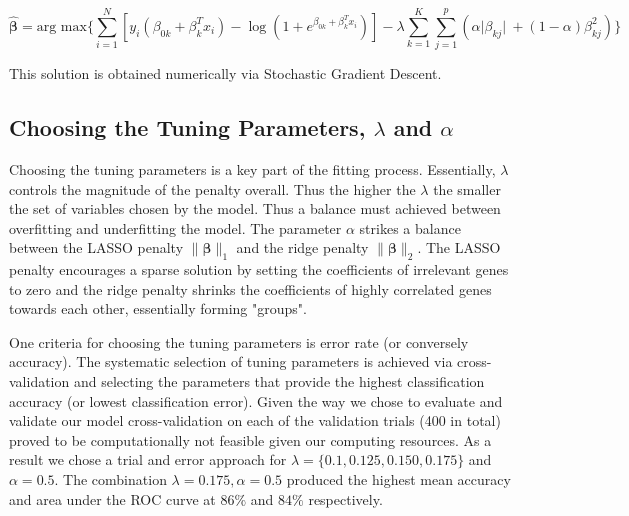 \documentclass[12pt,a4paper]{article}
\begin{document}
\begin{equation} \label{eq:8}
\boldsymbol{\hat{\beta}} = \text{arg max}\Biggr\{\sum_{i=1}^N 
\left[ y_i\left( \beta_{0k}+\beta_k^T x_i \right) -\log \left( 1 + e^{\beta_{0k} + \beta_k^T x_i} \right) \right]-\lambda \sum_{k = 1}^K \sum_{j = 1}^p \left(\alpha\vert\beta_{kj}\vert\ +  \left(1-\alpha\right)\beta_{kj}^2\right) \Biggr\}
\end{equation}
\par This solution is obtained numerically via Stochastic Gradient Descent.
\subsection{Choosing the Tuning Parameters, $\lambda$ and $\alpha$}
Choosing the tuning parameters is a key part of the fitting process. Essentially, $\lambda$ controls the magnitude of the penalty overall. Thus the higher the $\lambda$ the smaller the set of variables chosen by the model. Thus a balance must achieved between overfitting and underfitting the model. The parameter $\alpha$ strikes a balance between the LASSO penalty $\|\boldsymbol{\beta}\|_1$ and the ridge penalty $\|\boldsymbol{\beta}\|_2$. The LASSO penalty encourages a sparse solution by setting the coefficients of irrelevant genes to zero and the ridge penalty shrinks the coefficients of highly correlated genes towards each other, essentially forming "groups". \\
\par One criteria for choosing the tuning parameters is error rate (or conversely accuracy). The systematic selection of tuning parameters is achieved via cross-validation and selecting the parameters that provide the highest classification accuracy (or lowest classification error). Given the way we chose to evaluate and validate our model cross-validation on each of the validation trials (400 in total) proved to be computationally not feasible given our computing resources. As a result we chose a trial and error approach for $\lambda=\{0.1,0.125,0.150,0.175\}$ and $\alpha = 0.5$. The combination $\lambda = 0.175, \alpha = 0.5$ produced the highest mean accuracy and area under the ROC curve at $86\%$ and $84\%$ respectively.
\end{document}
